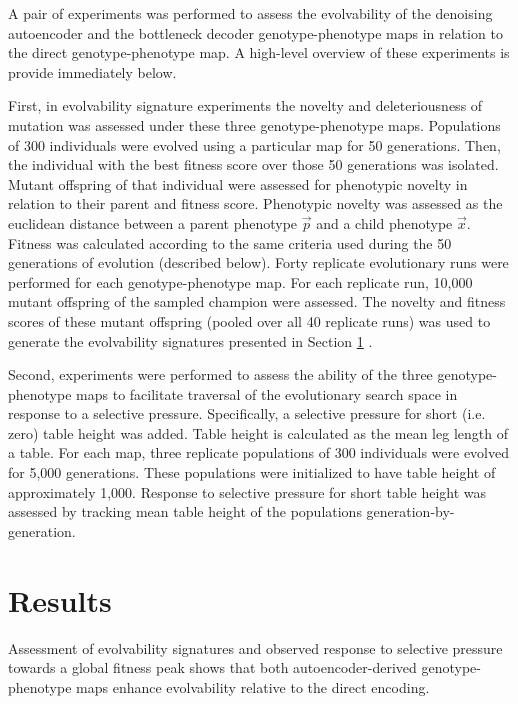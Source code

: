 A pair of experiments was performed to assess the evolvability of the denoising autoencoder and the bottleneck decoder genotype-phenotype maps in relation to the direct genotype-phenotype map.
A high-level overview of these experiments is provide immediately below.


First, in evolvability signature experiments the novelty and deleteriousness of mutation was assessed under these three genotype-phenotype maps.
Populations of 300 individuals were evolved using a particular map for 50 generations.
Then, the individual with the best fitness score over those 50 generations was isolated.
Mutant offspring of that individual were assessed for phenotypic novelty in relation to their parent and fitness score.
Phenotypic novelty was assessed as the euclidean distance between a parent phenotype $\vec{p}$ and a child phenotype $\vec{x}$.
Fitness was calculated according to the same criteria used during the 50 generations of evolution (described below).
Forty replicate evolutionary runs were performed for each genotype-phenotype map.
For each replicate run, 10,000 mutant offspring of the sampled champion were assessed.
The novelty and fitness scores of these mutant offspring (pooled over all 40 replicate runs) was used to generate the evolvability signatures presented in Section \ref{sec:results} \cite{tarapore2015evolvability}.

Second, experiments were performed to assess the ability of the three genotype-phenotype maps to facilitate traversal of the evolutionary search space in response to a selective pressure.
Specifically, a selective pressure for short (i.e. zero) table height was added.
Table height is calculated as the mean leg length of a table.
For each map, three replicate populations of 300 individuals were evolved for 5,000 generations.
These populations were initialized to have table height of approximately 1,000.
Response to selective pressure for short table height was assessed by tracking mean table height of the populations generation-by-generation.




\section{Results} \label{sec:results}

Assessment of evolvability signatures and observed response to selective pressure towards a global fitness peak shows that both autoencoder-derived genotype-phenotype maps enhance evolvability relative to the direct encoding.

